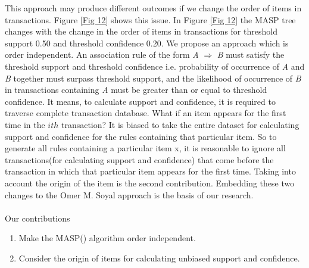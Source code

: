 \documentclass[preprint]{elsarticle}
\begin{document}
This approach may produce different outcomes if we change the order of items in transactions. Figure \ref{Fig 12} shows this issue. In Figure \ref{Fig 12} the MASP tree changes with the change in the order of items in transactions for threshold support 0.50 and threshold confidence 0.20. We propose an approach which is order independent. An association rule of the form \textit{A} $\Rightarrow$ \textit{B} must satisfy the threshold support and threshold confidence i.e. probability of occurrence of \textit{A} and \textit{B} together must surpass threshold support, and the likelihood of occurrence of \textit{B} in transactions containing \textit{A} must be greater than or equal to threshold confidence. It means, to calculate support and confidence, it is required to traverse complete transaction database. What if an item appears for the first time in the $ ith $ transaction? It is biased to take the entire dataset for calculating support and confidence for the rules containing that particular item. So to generate all rules containing a particular item x, it is reasonable to ignore all transactions(for calculating support and confidence) that come before the transaction in which that particular item appears for the first time. Taking into account the origin of the item is the second contribution. Embedding these two changes to the Omer M. Soyal \cite{oldmasp} approach is the basis of our research.\\
\\
Our contributions
\begin{enumerate}[1)]
\item Make the MASP(\cite{oldmasp}) algorithm order independent.
\item Consider the origin of items for calculating unbiased support and confidence.
\end{enumerate}
\end{document}

